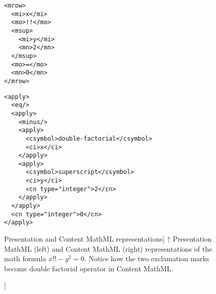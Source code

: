 \begin{figure}
\begingroup
\makeatletter
\let\bfseries\thesis@bfseries@old
\makeatother
\centering
\begin{minipage}{0.27\textwidth}
\begin{verbatim}
<mrow>
  <mi>x</mi>
  <mo>!!</mo>
  <msup>
    <mi>y</mi>
    <mn>2</mn>
  </msup>
  <mo>=</mo>
  <mn>0</mn>
</mrow>
\end{verbatim}
\end{minipage}%
\begin{minipage}{0.73\textwidth}
\begin{verbatim}
<apply>
  <eq/>
  <apply>
    <minus/>
    <apply>
      <csymbol>double-factorial</csymbol>
      <ci>x</ci>
    </apply>
    <apply>
      <csymbol>superscript</csymbol>
      <ci>y</ci>
      <cn type="integer">2</cn>
    </apply>
  </apply>
  <cn type="integer">0</cn>
</apply>
\end{verbatim}
\end{minipage}
\endgroup
\caption
  [Presentation and Content MathML representations]%
  {↑ Presentation MathML (left) and Content MathML (right)
   representations of the math formula $x!! - y^2 = 0$. Notice how the two
   exclamation marks become double factorial operator in Content MathML.
   \cite[Figure 2]{novotny2020three}}
\label{fig:pmml-and-cmml}
\end{figure}
